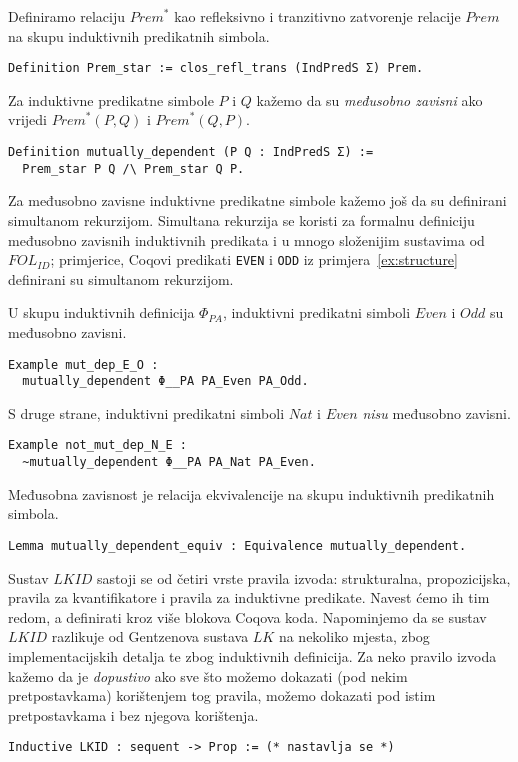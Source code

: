 \begin{definition}
  Definiramo relaciju \(\mathit{Prem}^{\ast}\) kao refleksivno i tranzitivno zatvorenje relacije \(\mathit{Prem}\) na skupu induktivnih predikatnih simbola.
\begin{verbatim}
Definition Prem_star := clos_refl_trans (IndPredS Σ) Prem.
\end{verbatim}
  \noindent Za induktivne predikatne simbole \(P\) i \(Q\) kažemo da su
  \textit{međusobno zavisni} ako vrijedi \(\mathit{Prem}^{\ast}(P, Q)\) i \(\mathit{Prem}^{\ast}(Q, P)\).
\begin{verbatim}
Definition mutually_dependent (P Q : IndPredS Σ) :=
  Prem_star P Q /\ Prem_star Q P.
\end{verbatim}
  \noindent Za međusobno zavisne induktivne predikatne simbole kažemo još da su
  definirani simultanom rekurzijom.
  Simultana rekurzija se koristi za formalnu definiciju međusobno zavisnih induktivnih predikata
  i u mnogo složenijim sustavima od \(\mathit{FOL}_{\mathit{ID}}\); primjerice,
  Coqovi predikati \texttt{EVEN} i \texttt{ODD} iz primjera~\ref{ex:structure}
  definirani su simultanom rekurzijom.
\end{definition}

\begin{example}
  U skupu induktivnih definicija \(\Phi_{\mathit{PA}}\),
  induktivni predikatni simboli \(\mathit{Even}\) i \(\mathit{Odd}\)
  su međusobno zavisni.
\begin{verbatim}
Example mut_dep_E_O :
  mutually_dependent Φ__PA PA_Even PA_Odd.
\end{verbatim}
  \noindent S druge strane, induktivni predikatni simboli \(\mathit{Nat}\) i \(\mathit{Even}\)
  \textit{nisu} međusobno zavisni.
\begin{verbatim}
Example not_mut_dep_N_E :
  ~mutually_dependent Φ__PA PA_Nat PA_Even.
\end{verbatim}
\end{example}

\begin{lemma}
  Međusobna zavisnost je relacija ekvivalencije na skupu induktivnih predikatnih simbola.
\begin{verbatim}
Lemma mutually_dependent_equiv : Equivalence mutually_dependent.
\end{verbatim}
\end{lemma}

Sustav \(\mathit{LKID}\) sastoji se od četiri vrste pravila izvoda:
strukturalna, propozicijska, pravila za kvantifikatore i pravila za induktivne predikate.
Navest ćemo ih tim redom, a definirati kroz više blokova Coqova koda.
Napominjemo da se sustav \(\mathit{LKID}\) razlikuje od Gentzenova sustava \(\mathit{LK}\)
na nekoliko mjesta, zbog implementacijskih detalja te zbog induktivnih definicija.
Za neko pravilo izvoda kažemo da je \textit{dopustivo} ako
sve što možemo dokazati (pod nekim pretpostavkama)
korištenjem tog pravila, možemo dokazati pod istim pretpostavkama
i bez njegova korištenja.
\begin{verbatim}
Inductive LKID : sequent -> Prop := (* nastavlja se *)
\end{verbatim}
